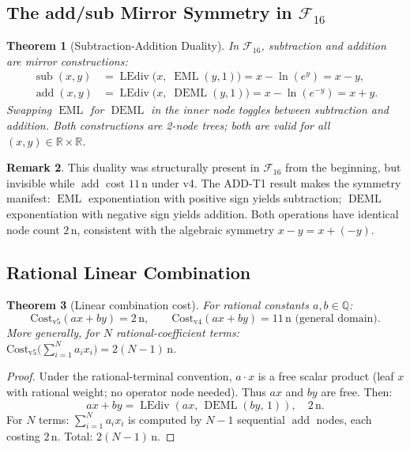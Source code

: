 \documentclass[12pt,a4paper]{article}
\newtheorem{theorem}{Theorem}[section]
\theoremstyle{definition}
\newtheorem{remark}[theorem]{Remark}
\newcommand{\EML}{\operatorname{EML}}
\newcommand{\DEML}{\operatorname{DEML}}
\newcommand{\LEdiv}{\operatorname{LEdiv}}
\newcommand{\subop}{\operatorname{sub}}
\newcommand{\addop}{\operatorname{add}}
\newcommand{\Cost}{\mathrm{Cost}}
\newcommand{\F}{\mathcal{F}_{16}}
\newcommand{\R}{\mathbb{R}}
\begin{document}
\subsection{The add/sub Mirror Symmetry in $\mathcal{F}_{16}$}

\begin{theorem}[Subtraction-Addition Duality]
\label{thm:duality}
In $\mathcal{F}_{16}$, subtraction and addition are mirror constructions:
\begin{align}
  \subop(x,y) &= \LEdiv\!\bigl(x,\;\EML(y,1)\bigr) = x - \ln(e^y) = x - y, \\
  \addop(x,y) &= \LEdiv\!\bigl(x,\;\DEML(y,1)\bigr) = x - \ln(e^{-y}) = x + y.
\end{align}
Swapping $\EML$ for $\DEML$ in the inner node toggles between subtraction and
addition.  Both constructions are 2-node trees; both are valid for all
$(x, y) \in \R \times \R$.
\end{theorem}

\begin{remark}
This duality was structurally present in $\F$ from the beginning, but invisible
while $\addop$ cost $11\,\text{n}$ under v4.  The ADD-T1 result makes the
symmetry manifest: $\EML$ exponentiation with positive sign yields subtraction;
$\DEML$ exponentiation with negative sign yields addition.  Both operations
have identical node count $2\,\text{n}$, consistent with the algebraic symmetry
$x - y = x + (-y)$.
\end{remark}

\subsection{Rational Linear Combination}

\begin{theorem}[Linear combination cost]
\label{thm:linear_combo}
For rational constants $a, b \in \mathbb{Q}$:
\[
  \Cost_{\mathrm{v5}}(ax + by) = 2\,\text{n}, \qquad
  \Cost_{\mathrm{v4}}(ax + by) = 11\,\text{n} \text{ (general domain)}.
\]
More generally, for $N$ rational-coefficient terms:
$\Cost_{\mathrm{v5}}\!\bigl(\sum_{i=1}^{N} a_i x_i\bigr) = 2(N-1)\,\text{n}$.
\end{theorem}

\begin{proof}
Under the rational-terminal convention, $a \cdot x$ is a free scalar product
(leaf $x$ with rational weight; no operator node needed).
Thus $ax$ and $by$ are free.  Then:
\[
  ax + by = \LEdiv(ax,\,\DEML(by,\,1)), \quad 2\,\text{n}.
\]
For $N$ terms: $\sum_{i=1}^{N} a_i x_i$ is computed by $N-1$ sequential
$\addop$ nodes, each costing $2\,\text{n}$.  Total: $2(N-1)\,\text{n}$.
\end{proof}
\end{document}
